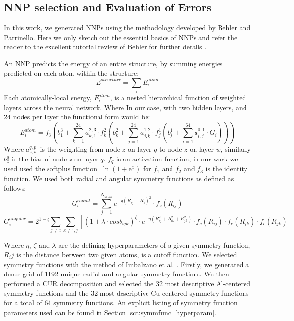 \documentclass{article}
\begin{document}
\subsection{NNP selection and Evaluation of Errors} \label{sct:nnp_select_and_eval}
In this work, we generated NNPs using the methodology developed by Behler and Parrinello\cite{Behler2007}.
Here we only sketch out the essential basics of NNPs and refer the reader to the excellent tutorial review of Behler for further details \cite{Behler2015}. 


An NNP predicts the energy of an entire structure, by summing energies predicted on each atom within the structure: 
\begin{equation}
E^{structure} = \sum_i E^{atom}_i
\end{equation}
Each atomically-local energy, $E^{atom}_i$, is a nested hierarchical function of weighted layers across the neural network.
Where In our case, with two hidden layers, and 24 nodes per layer the functional form would be:
\begin{equation}
E^{atom}_i = f_3 ( b^3_1+\sum^{24}_{k=1}a^{2,3}_{k,1}\cdot f^2_k(b^2_k+\sum^{24}_{j=1}a^{1,2}_{j,k}\cdot f^1_j ( b^1_j + \sum^{64}_{i=1} a^{0,1}_{i,j}\cdot G_i  ))) 
\end{equation}
Where $a^{q,p}_{z,w}$ is the weighting from node $z$ on layer $q$ to node $z$ on layer $w$, similarly $b^q_z$ is
the bias of node $z$ on layer $q$. $f_q$ is an activation function, in our work we used used the softplus function,
$\ln (1 + \mathrm{e}^x)$ for $f_1$ and $f_2$ and $f_3$ is the identity function. 
We used both radial and angular symmetry functions as  defined as follows:
\begin{equation}
G^{radial}_i = \sum^{N_{atom}}_{j=1}e^{-\eta(R_{ij}-R_{s})^2}\cdot f_c(R_{ij})
\end{equation}
\begin{equation}
G^{angular}_i = 2^{1-\zeta}\sum_{j\neq i}\sum_{k\neq i,j}[ (1+\lambda\cdot cos\theta_{ijk})^\zeta \cdot e^{-\eta(R^2_{ij}+R^2_{ik}+R^2_{jk})}\cdot f_c(R_{ij}) \cdot f_c(R_{jk}) \cdot f_c(R_{jk}) ]
\end{equation}

Where $\eta$, $\zeta$ and $\lambda$ are the defining hyperparameters of a given symmetry function, $R_ij$ is the distance between two given atoms, is a cutoff function. 
We selected symmetry functions with the method of Imbalzano et al. \cite{Imbalzano2018}.
Firstly, we generated a dense grid of 1192 unique radial and angular symmetry functions.
We then performed a CUR decomposition and selected the 32 most descriptive Al-centered symmetry functions and the 32 most descriptive Cu-centered symmetry functions for a total of 64 symmetry functions. 
An explicit listing of symmetry function parameters used can be found in Section \ref{sct:symmfunc_hyperparam}.
\end{document}
